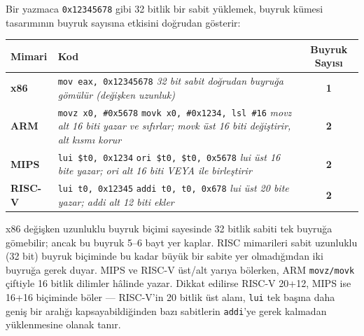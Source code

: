 \begin{karsilastirma}
Bir yazmaca \texttt{0x12345678} gibi 32 bitlik bir sabit yüklemek, buyruk kümesi tasarımının buyruk sayısına etkisini doğrudan gösterir:

\begin{center}
\footnotesize
\begin{tabular}{lp{10cm}c}
\toprule
\textbf{Mimari} & \textbf{Kod} & \textbf{Buyruk Sayısı} \\
\midrule
\textbf{x86} & \texttt{mov eax, 0x12345678} \newline \textit{\scriptsize 32 bit sabit doğrudan buyruğa gömülür (değişken uzunluk)} & \textbf{1} \\
\midrule
\textbf{ARM} & \texttt{movz x0, \#0x5678} \newline \texttt{movk x0, \#0x1234, lsl \#16} \newline \textit{\scriptsize movz alt 16 biti yazar ve sıfırlar; movk üst 16 biti değiştirir, alt kısmı korur} & \textbf{2} \\
\midrule
\textbf{MIPS} & \texttt{lui \$t0, 0x1234} \newline \texttt{ori \$t0, \$t0, 0x5678} \newline \textit{\scriptsize lui üst 16 bite yazar; ori alt 16 biti VEYA ile birleştirir} & \textbf{2} \\
\midrule
\textbf{RISC-V} & \texttt{lui t0, 0x12345} \newline \texttt{addi t0, t0, 0x678} \newline \textit{\scriptsize lui üst 20 bite yazar; addi alt 12 biti ekler} & \textbf{2} \\
\bottomrule
\end{tabular}
\end{center}

x86 değişken uzunluklu buyruk biçimi sayesinde 32 bitlik sabiti tek buyruğa gömebilir; ancak bu buyruk 5--6 bayt yer kaplar. RISC mimarileri sabit uzunluklu (32 bit) buyruk biçiminde bu kadar büyük bir sabite yer olmadığından iki buyruğa gerek duyar. MIPS ve RISC-V üst/alt yarıya bölerken, ARM \texttt{movz/movk} çiftiyle 16 bitlik dilimler hâlinde yazar. Dikkat edilirse RISC-V 20+12, MIPS ise 16+16 biçiminde böler --- RISC-V'in 20 bitlik üst alanı, \texttt{lui} tek başına daha geniş bir aralığı kapsayabildiğinden bazı sabitlerin \texttt{addi}'ye gerek kalmadan yüklenmesine olanak tanır.
\end{karsilastirma}

